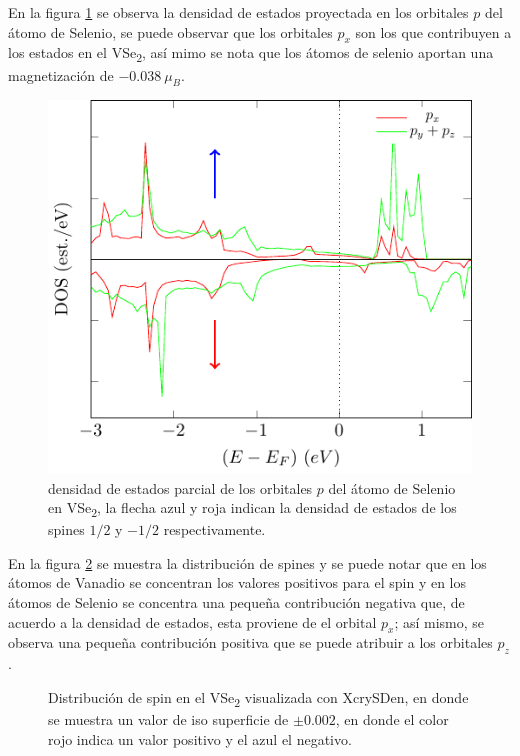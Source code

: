 \newline
En la figura \ref{Sim:fig:pDOSseVse2} se observa la densidad de estados proyectada en los orbitales $p$ del \'atomo de Selenio, se puede observar que los orbitales $p_{x}$ son los que contribuyen a los estados en el VSe\textsubscript{2}, as\'i mimo se nota que los \'atomos de selenio aportan una magnetizaci\'on de $ -0.038~ \mu_{B}$.
\begin{figure}[!hbt]
	\centering
	\includegraphics[scale=1]{figRes/VSe2/bandas/celU/nosoc/pdosSe.pdf}
	\caption[Densidad de estados proyectada de los orbitales $p$ del Selenio en VSe\textsubscript{2}.]{densidad de estados parcial de los orbitales $p$ del \'atomo de Selenio en VSe\textsubscript{2}, la flecha azul y roja indican la densidad de estados de los spines $1/2$ y $-1/2$ respectivamente.}
	\label{Sim:fig:pDOSseVse2}
\end{figure}
\par En la figura \ref{Sim:fig:distmagnVse2} se muestra la distribuci\'on de spines  y se puede notar que en los \'atomos de Vanadio se concentran los  valores positivos para el spin y en los \'atomos de Selenio se concentra una peque\~na contribuci\'on negativa que, de acuerdo a la densidad de estados, esta proviene de el orbital $p_x$; as\'i mismo, se observa una peque\~na contribuci\'on positiva que se puede atribuir a los orbitales $p_z$.
\begin{figure}[!hbt]
	\centering
	\caption[Distribuci\'on de spin en VSe\textsubscript{2}]{Distribuci\'on  de spin en el VSe\textsubscript{2} visualizada con XcrySDen, en donde se muestra un valor de iso superficie de $\pm 0.002$, en donde el color rojo indica un valor positivo y el azul el negativo.}
	\label{Sim:fig:distmagnVse2}
\end{figure}
